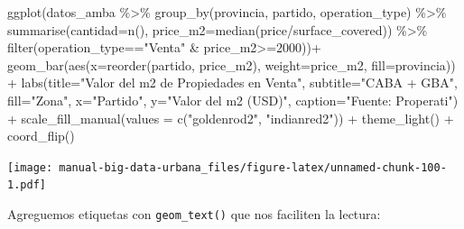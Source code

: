 \documentclass[
  spanish,
]{book}
\newenvironment{Shaded}{\begin{snugshade}}{\end{snugshade}}
\newcommand{\AttributeTok}[1]{\textcolor[rgb]{0.77,0.63,0.00}{#1}}
\newcommand{\DecValTok}[1]{\textcolor[rgb]{0.00,0.00,0.81}{#1}}
\newcommand{\FunctionTok}[1]{\textcolor[rgb]{0.00,0.00,0.00}{#1}}
\newcommand{\NormalTok}[1]{#1}
\newcommand{\SpecialCharTok}[1]{\textcolor[rgb]{0.00,0.00,0.00}{#1}}
\newcommand{\StringTok}[1]{\textcolor[rgb]{0.31,0.60,0.02}{#1}}
\begin{document}
\begin{Shaded}
\begin{Highlighting}[]
\FunctionTok{ggplot}\NormalTok{(datos\_amba }\SpecialCharTok{\%\textgreater{}\%}
        \FunctionTok{group\_by}\NormalTok{(provincia, partido, operation\_type) }\SpecialCharTok{\%\textgreater{}\%}
        \FunctionTok{summarise}\NormalTok{(}\AttributeTok{cantidad=}\FunctionTok{n}\NormalTok{(),}
                  \AttributeTok{price\_m2=}\FunctionTok{median}\NormalTok{(price}\SpecialCharTok{/}\NormalTok{surface\_covered)) }\SpecialCharTok{\%\textgreater{}\%}
        \FunctionTok{filter}\NormalTok{(operation\_type}\SpecialCharTok{==}\StringTok{"Venta"} \SpecialCharTok{\&}\NormalTok{ price\_m2}\SpecialCharTok{\textgreater{}=}\DecValTok{2000}\NormalTok{))}\SpecialCharTok{+}
  \FunctionTok{geom\_bar}\NormalTok{(}\FunctionTok{aes}\NormalTok{(}\AttributeTok{x=}\FunctionTok{reorder}\NormalTok{(partido, price\_m2), }\AttributeTok{weight=}\NormalTok{price\_m2, }\AttributeTok{fill=}\NormalTok{provincia)) }\SpecialCharTok{+}
  \FunctionTok{labs}\NormalTok{(}\AttributeTok{title=}\StringTok{"Valor del m2 de Propiedades en Venta"}\NormalTok{,}
       \AttributeTok{subtitle=}\StringTok{"CABA + GBA"}\NormalTok{,}
       \AttributeTok{fill=}\StringTok{"Zona"}\NormalTok{,}
       \AttributeTok{x=}\StringTok{"Partido"}\NormalTok{,}
       \AttributeTok{y=}\StringTok{"Valor del m2 (USD)"}\NormalTok{,}
       \AttributeTok{caption=}\StringTok{"Fuente: Properati"}\NormalTok{) }\SpecialCharTok{+}
  \FunctionTok{scale\_fill\_manual}\NormalTok{(}\AttributeTok{values =} \FunctionTok{c}\NormalTok{(}\StringTok{"goldenrod2"}\NormalTok{, }\StringTok{"indianred2"}\NormalTok{)) }\SpecialCharTok{+}
  \FunctionTok{theme\_light}\NormalTok{() }\SpecialCharTok{+}
  \FunctionTok{coord\_flip}\NormalTok{()}
\end{Highlighting}
\end{Shaded}

\texttt{[image: manual-big-data-urbana\_files/figure-latex/unnamed-chunk-100-1.pdf]}

Agreguemos etiquetas con \texttt{geom\_text()} que nos faciliten la lectura:
\end{document}
